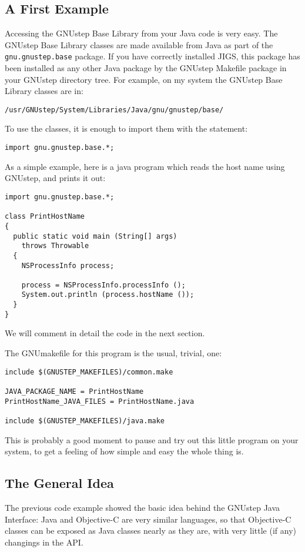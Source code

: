 \subsection{A First Example}

Accessing the GNUstep Base Library from your Java code is very easy.
The GNUstep Base Library classes are made available from Java as part
of the \texttt{gnu.gnustep.base} package.  If you have correctly
installed JIGS, this package has been installed as any other Java
package by the GNUstep Makefile package in your GNUstep directory
tree.  For example, on my system the GNUstep Base Library classes are
in:
\begin{verbatim}
/usr/GNUstep/System/Libraries/Java/gnu/gnustep/base/
\end{verbatim}
To use the classes, it is enough to import them with the statement:
\begin{verbatim}
import gnu.gnustep.base.*;
\end{verbatim}

As a simple example, here is a java program which reads the host name
using GNUstep, and prints it out:
\begin{verbatim}
import gnu.gnustep.base.*;

class PrintHostName
{ 
  public static void main (String[] args) 
    throws Throwable
  {
    NSProcessInfo process;

    process = NSProcessInfo.processInfo ();
    System.out.println (process.hostName ());
  }
}
\end{verbatim}
We will comment in detail the code in the next section.

The GNUmakefile for this program is the usual, trivial, one:
\begin{verbatim}
include $(GNUSTEP_MAKEFILES)/common.make

JAVA_PACKAGE_NAME = PrintHostName
PrintHostName_JAVA_FILES = PrintHostName.java

include $(GNUSTEP_MAKEFILES)/java.make
\end{verbatim}
This is probably a good moment to pause and try out this little
program on your system, to get a feeling of how simple and easy the
whole thing is.

\subsection{The General Idea}
The previous code example showed the basic idea behind the GNUstep
Java Interface: Java and Objective-C are very similar languages, so
that Objective-C classes can be exposed as Java classes nearly as they
are, with very little (if any) changings in the API.

